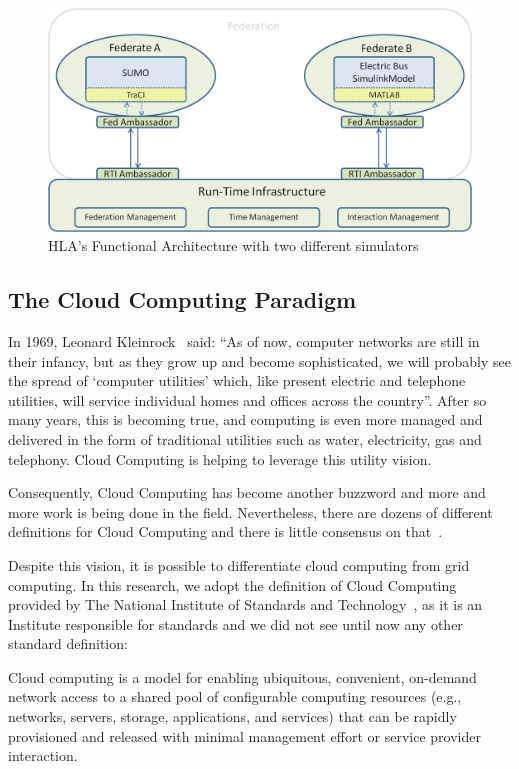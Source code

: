 \documentclass[conference]{IEEEtran}
\begin{document}
\begin{figure}[!ht]
\centering
\includegraphics[width=.9\linewidth]{hla_macedo.png}
\caption{ HLA's Functional Architecture with two different simulators \cite{macedo2013integrated}}
\label{fig:hla_macedo}
\vspace{-0.9em}
\end{figure}

\subsection{The Cloud Computing Paradigm}
In 1969, Leonard Kleinrock~\cite{kleinrock2005vision} said: ``As of now, computer networks are still in their infancy, but as they grow up and become sophisticated, we will probably see the spread of `computer utilities' which, like present electric and telephone utilities, will service individual homes and offices across the country''. After so many years, this is becoming true, and computing is even more managed and delivered in the form of traditional utilities such as water, electricity, gas and telephony. Cloud Computing is helping to leverage this utility vision.  

Consequently, Cloud Computing has become another buzzword and more and more work is being done in the field. Nevertheless, there are dozens of different definitions for Cloud Computing and there is little consensus on that~\cite{geelan2009twenty}.

Despite this vision, it is possible to differentiate cloud computing from grid computing. In this research, we adopt the definition of Cloud Computing provided by The National Institute of Standards and Technology~\cite{mell2011nist}, as it is an Institute responsible for standards and we did not see until now any other standard definition:

Cloud computing is a model for enabling ubiquitous, convenient, on-demand network access to a shared pool of configurable computing resources (e.g., networks, servers, storage, applications, and services) that can be rapidly provisioned and released with minimal management effort or service provider interaction.
\end{document}
